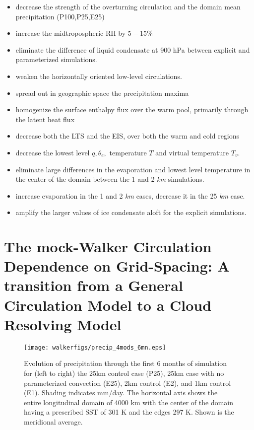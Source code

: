 \documentclass[11pt]{article}   	%
\begin{document}
\begin{itemize}
  \item decrease the strength of the overturning circulation and the domain mean precipitation (P100,P25,E25)
  \item increase the midtropospheric RH by $5-15 \% $
  \item eliminate the difference of liquid condensate at 900 hPa between explicit and parameterized simulations.
  \item weaken the horizontally oriented low-level circulations.   
  \item spread out in geographic space the precipitation maxima
  \item homogenize the surface enthalpy flux over the warm pool, primarily through the latent heat flux
  \item decrease both the LTS and the EIS, over both the warm and cold regions
  \item decrease the lowest level $q, \theta_e,$ temperature $T$ and virtual temperature $T_v$.  
  \item eliminate large differences in the evaporation and lowest level temperature in the center of the domain between 
           the 1 and 2 \textit{km} simulations. 
  \item increase evaporation in the 1 and 2 \textit{km} cases, decrease it in the 25 \textit{km} case.
  \item amplify the larger values of ice condensate aloft for the explicit simulations.  
\end{itemize}


\section{The mock-Walker Circulation Dependence on Grid-Spacing: A transition from a 
General Circulation Model to a Cloud Resolving Model}

\begin{figure}
  \texttt{[image: walkerfigs/precip\_4mods\_6mn.eps]}
  \caption{Evolution of precipitation through the first 6 months of simulation for (left to right) the 25km control case (P25), 
  25km case with no parameterized convection (E25), 2km control (E2), and 1km control (E1).  
  Shading indicates mm/day.  The horizontal axis shows the entire 
  longitudinal domain of 4000 km with the center of the domain having a prescribed SST of 301 K and the edges 297 K.  
  Shown is the meridional average. }
  \label{fig:hov_4mods_6mn}
\end{figure}
\end{document}

